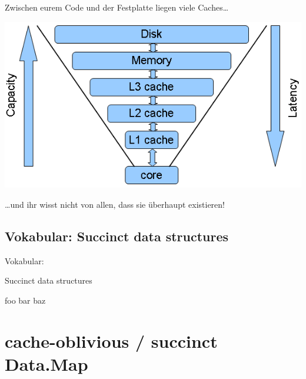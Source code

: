 \documentclass{beamer}
\begin{document}
\begin{frame}

Zwischen eurem Code und der Festplatte liegen viele Caches\dots

\begin{center}
\includegraphics[scale=0.35]{cpu_cache_structure.png} 
\end{center}
\pause

\dots und ihr wisst nicht von allen, dass sie überhaupt existieren!

\end{frame}

\subsection{Vokabular: Succinct data structures}

\begin{frame}
\Large
\begin{center}
Vokabular:

Succinct data structures
\end{center}
\normalsize
\end{frame}


\begin{frame}
foo bar baz
\end{frame}

\section{cache-oblivious / succinct Data.Map}
\end{document}
